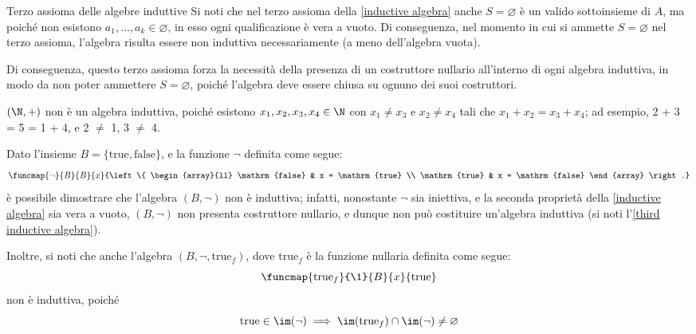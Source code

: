\documentclass[a4paper, 12pt]{report}
\begin{document}
    \begin{framedobs}[label={third inductive algebra}]{Terzo assioma delle algebre induttive}
        Si noti che nel terzo assioma della \cref{inductive algebra} anche $S = \varnothing$ è un valido sottoinsieme di $A$, ma poiché non esistono $a_1, \ldots, a_k \in \varnothing$, in esso ogni qualificazione è vera a vuoto. Di conseguenza, nel momento in cui si ammette $S = \varnothing$ nel terzo assioma, l'algebra risulta essere non induttiva necessariamente (a meno dell'algebra vuota).
        
        Di conseguenza, questo terzo assioma forza la necessità della presenza di un costruttore nullario all'interno di ogni algebra induttiva, in modo da non poter ammettere $S = \varnothing$, poiché l'algebra deve essere chiusa su ognuno dei suoi costruttori.
    \end{framedobs}

    \begin{example}
        $(\N, +)$ non è un algebra induttiva, poiché esistono $x_1, x_2, x_3, x_4 \in \N$ con $x_1 \neq x_3$ e $x_2 \neq x_4$ tali che $x_1 + x_2 = x_3 + x_4$; ad esempio, 2 + 3 = 5 = 1 + 4, e 2 $\neq$ 1, 3 $\neq$ 4.
    \end{example}

    \begin{example}
        Dato l'insieme $B = \{ \mathrm{true}, \mathrm{false}\}$, e la funzione $\lnot$ definita come segue: $$\funcmap{\lnot}{B}{B}{x}{\left \{ \begin{array}{ll} \mathrm{false} & x = \mathrm{true} \\ \mathrm{true} & x = \mathrm{false} \end{array} \right.}$$ è possibile dimostrare che l'algebra $(B, \lnot)$ non è induttiva; infatti, nonostante $\lnot$ sia iniettiva, e la seconda proprietà della \cref{inductive algebra} sia vera a vuoto, $(B, \lnot)$ non presenta costruttore nullario, e dunque non può costituire un'algebra induttiva (si noti l'\cref{third inductive algebra}).

        Inoltre, si noti che anche l'algebra $(B, \lnot, \mathrm{true}_f)$, dove $\mathrm{true}_f$ è la funzione nullaria definita come segue: $$\funcmap{\mathrm{true}_f}{\1}{B}{x}{\mathrm{true}}$$ non è induttiva, poiché $$\mathrm{true} \in \im(\lnot) \implies \im(\mathrm{true}_f) \cap \im(\lnot) \neq \varnothing$$
    \end{example}
\end{document}
